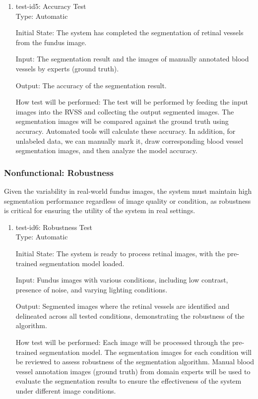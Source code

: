 \documentclass[12pt, titlepage]{article}
\begin{document}
\begin{enumerate}

\item{test-id5: Accuracy Test\\}
\label{test-id-5}
Type: Automatic
					
Initial State: The system has completed the segmentation of retinal vessels from the fundus image.
					
Input: The segmentation result and the images of manually annotated blood vessels by experts (ground truth).
					
Output: The accuracy of the segmentation result. 
					
How test will be performed: The test will be performed by feeding the input images into the RVSS and collecting the output segmented images. The segmentation images will be compared against the ground truth using accuracy. Automated tools will calculate these accuracy. In addition, for unlabeled data, we can manually mark it, draw corresponding blood vessel segmentation images, and then analyze the model accuracy.
\end{enumerate}


\subsubsection{Nonfunctional: Robustness}
\label{non_functional_Robustness}		
Given the variability in real-world fundus images, the system must maintain high segmentation performance regardless of image quality or condition, as robustness is critical for ensuring the utility of the system in real settings. 

\begin{enumerate}

\item{test-id6: Robustness Test\\}
\label{test-id-6}
Type: Automatic
					
Initial State: The system is ready to process retinal images, with the pre-trained segmentation model loaded.
					
Input: Fundus images with various conditions, including low contrast, presence of noise, and varying lighting conditions.
					
Output: Segmented images where the retinal vessels are identified and delineated across all tested conditions, demonstrating the robustness of the algorithm.

How test will be performed: Each image will be processed through the pre-trained segmentation model. The segmentation images for each condition will be reviewed to assess robustness of the segmentation algorithm. Manual blood vessel annotation images (ground truth) from domain experts will be used to evaluate the segmentation results to ensure the effectiveness of the system under different image conditions.
\end{enumerate}
\end{document}

